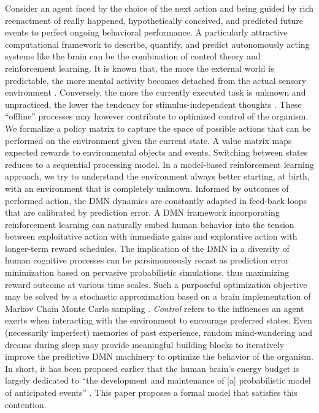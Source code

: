 \documentclass{article} %
\begin{document}
Consider an agent faced by the choice of the next action
and being guided by rich
reenactment of really happened, hypothetically conceived, and
predicted future events to perfect ongoing behavioral performance.
A particularly attractive computational framework
to describe, quantify, and predict autonomously acting systems like the brain
can be the combination of control theory and reinforcement learning.
It is known that, the more the external world is predictable,
the more mental activity becomes detached from the actual sensory environment
\citep{antrobus1966studies, pope1978regulation}.
Conversely,
the more the currently executed task is unknown and unpracticed,
the lower the tendency for stimulus-independent thoughts
\citep{filler1973daydreaming, teasdale1995stimulus}.
These ``offline'' processes may however contribute to optimized control of the organism.
We formalize
a policy matrix to capture the space of possible actions that can be performed
on the environment given the current state. A value matrix
maps expected rewards to environmental objects and events.
Switching between states reduces to a sequential processing model.
In a model-based reinforcement learning approach,
we try to understand the environment always better
starting, at birth, with an environment that is completely unknown.
Informed by outcomes of performed action,
the DMN dynamics are constantly adapted in feed-back loops
that are calibrated by prediction error.
A DMN framework incorporating reinforcement learning
can naturally embed human behavior
into the tension between exploitative action with immediate gains and
explorative action with longer-term reward schedules.
The implication of the DMN in a diversity of human cognitive processes
can be parsimoneously recast as prediction error minimization
based on pervasive probabilistic simulations,
thus maximizing reward outcome at various time scales.
Such a purposeful optimization objective
may be solved by a stochastic approximation
based on a brain implementation of Markov Chain Monte Carlo sampling
\citep{tenenbaum2011grow}.
\textit{Control} refers to the influences an agent exerts when interacting
with the environment to encourage preferred states.
Even (necessarily imperfect) memories
of past experience, random mind-wandering and dreams during sleep
may provide meaningful building blocks to iteratively improve
the predictive DMN machinery to optimize the behavior of the organism.
%
In short, it has been proposed earlier that
the human brain's energy budget is largely dedicated to
``the development and maintenance of [a]
probabilistic model of anticipated events''
\citep{raichle2005intrinsic}.
This paper proposes a formal model that
satisfies this contention.
\end{document}
